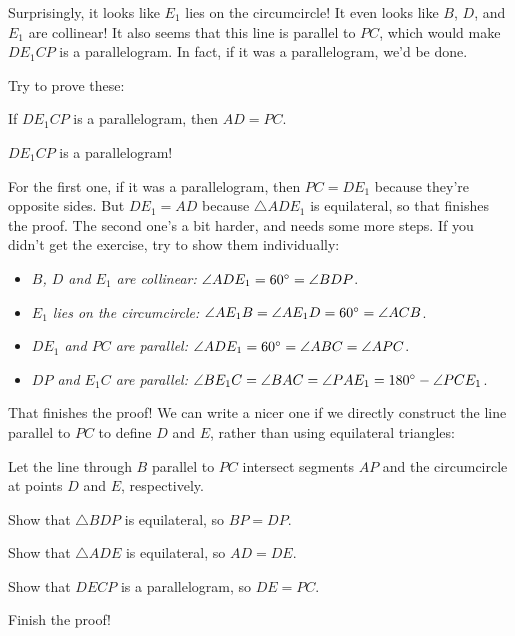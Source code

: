 \documentclass[11pt,paper=letter]{scrartcl}
\begin{document}
Surprisingly, it looks like $E_1$ lies on the circumcircle! It even looks like $B$, $D$, and $E_1$ are collinear! It also seems that this line is parallel to $PC$, which would make $DE_1CP$ is a parallelogram. In fact, if it was a parallelogram, we'd be done. 

\begin{exboxed} Try to prove these:
  \begin{enumthin}
    \item[(a)] If $DE_1CP$ is a parallelogram, then $AD = PC$.
    \item[(b)] $DE_1CP$ is a parallelogram! \hints{\ref{h:vs02} \ref{h:vs03}}
  \end{enumthin}
\end{exboxed}

For the first one, if it was a parallelogram, then $PC = DE_1$ because they're opposite sides. But $DE_1 = AD$ because $\triangle ADE_1$ is equilateral, so that finishes the proof. The second one's a bit harder, and needs some more steps. If you didn't get the exercise, try to show them individually:
\begin{itemize}[itemsep=-0.7ex]
  \item \emph{$B$, $D$ and $E_1$ are collinear:} $\angle ADE_1 = 60^\circ = \angle BDP$.
  \item \emph{$E_1$ lies on the circumcircle:} $\angle AE_1B = \angle AE_1D = 60^\circ = \angle ACB$.
  \item \emph{$DE_1$ and $PC$ are parallel:} $\angle ADE_1 = 60^\circ = \angle ABC = \angle APC$.
  \item \emph{$DP$ and $E_1C$ are parallel:} $\angle BE_1C = \angle BAC = \angle PAE_1 = 180^\circ - \angle PCE_1$.
\end{itemize}

That finishes the proof! We can write a nicer one if we directly construct the line parallel to $PC$ to define $D$ and $E$, rather than using equilateral triangles:

\begin{probboxed}
  Let the line through $B$ parallel to $PC$ intersect segments $AP$ and the circumcircle at points $D$ and $E$, respectively.
  \begin{enumthin}
    \item[(a)] Show that $\triangle BDP$ is equilateral, so $BP = DP$. \hint{\ref{h:vs04}}
    \item[(b)] Show that $\triangle ADE$ is equilateral, so $AD = DE$.
    \item[(c)] Show that $DECP$ is a parallelogram, so $DE = PC$. \hint{\ref{h:vs02}}
    \item[(d)] Finish the proof!
  \end{enumthin}
\end{probboxed}
\end{document}
